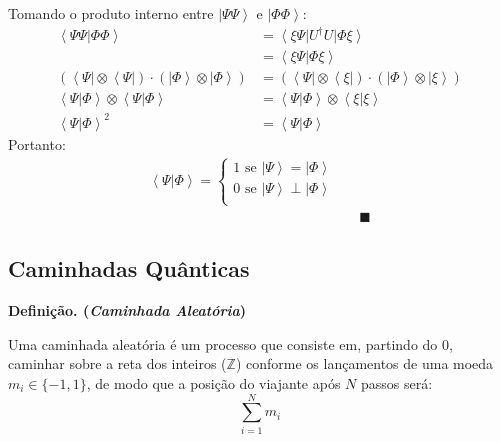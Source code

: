 \documentclass[t]{beamer}
\newcommand{\cqd}{\blacksquare}
\newcommand{\definicao}[1]{%
	\textbf{Definição. (\emph{#1})\\}
}
\newcommand{\ket}[1]{\ensuremath{\left|#1\right\rangle}}
\newcommand{\bra}[1]{\ensuremath{\left\langle#1\right|}}
\newcommand{\braket}[2]{\ensuremath{\left\langle#1|#2\right\rangle}}
\begin{document}
	\begin{frame}{\subsecname}
		Tomando o produto interno entre $\ket{\Psi\Psi}$ e $\ket{\Phi\Phi}$:
		\begin{align*}
		\braket{\Psi\Psi}{\Phi\Phi} &= \bra{\xi\Psi}U^{\dagger} U \ket{\Phi\xi}\\
		&= \braket{\xi\Psi}{\Phi\xi}\\
		(\bra{\Psi} \otimes \bra{\Psi}) \cdot (\ket{\Phi} \otimes \ket{\Phi}) &= (\bra{\Psi} \otimes \bra{\xi}) \cdot (\ket{\Phi} \otimes \ket{\xi})\\
		\braket{\Psi}{\Phi} \otimes \braket{\Psi}{\Phi} &= \braket{\Psi}{\Phi} \otimes \braket{\xi}{\xi}\\
		\braket{\Psi}{\Phi}^2 &= \braket{\Psi}{\Phi}
		\end{align*}
		Portanto:
		\begin{align*}
			\braket{\Psi}{\Phi} = \begin{cases}
			1 \text{ se } \ket{\Psi} = \ket{\Phi}\\
			0 \text{ se } \ket{\Psi} \perp \ket{\Phi}\\
			\end{cases}\\
		&& \cqd
		\end{align*}
	\end{frame}
	
	\subsection{Caminhadas Quânticas}
	
	\begin{frame}{\subsecname}
		\definicao{Caminhada Aleatória}
		Uma caminhada aleatória é um processo que consiste em, partindo do $0$, caminhar sobre a reta dos inteiros ($\mathbb{Z}$) conforme os lançamentos de uma moeda $m_i \in \{-1, 1\}$, de modo que a posição do viajante após $N$ passos será:
		$$\sum_{i=1}^{N} m_i$$
		\begin{center}
		\end{center}
		
	\end{frame}
\end{document}
